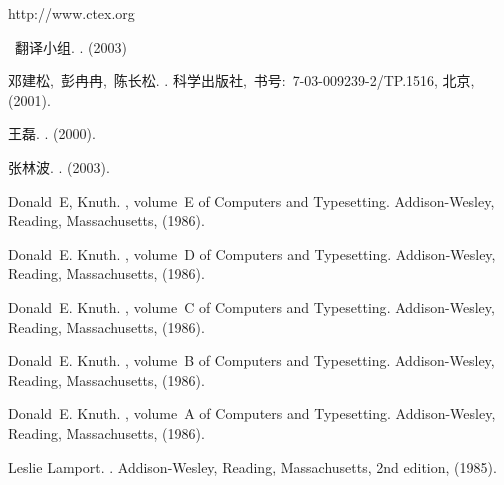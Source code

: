 
\fontsize{10.5pt}{10.5pt}\selectfont
\begin{thebibliography}{10}

 http://www.ctex.org


\CTeX{}~翻译小组.
.
\newblock (2003)


{邓建松,~彭冉冉,~陈长松}.
.
\newblock 科学出版社,~书号:~7-03-009239-2/TP.1516, 北京, (2001).

王磊.
.
\newblock (2000).

张林波.
.
\newblock (2003).

Donald~E, Knuth.
, volume~E of {Computers and
  Typesetting}.
\newblock Addison-Wesley, Reading, Massachusetts, (1986).

Donald~E. Knuth.
, volume~D of {Computers and
  Typesetting}.
\newblock Addison-Wesley, Reading, Massachusetts, (1986).

Donald~E. Knuth.
, volume~C of {Computers and
  Typesetting}.
\newblock Addison-Wesley, Reading, Massachusetts, (1986).

Donald~E. Knuth.
, volume~B of { Computers and
  Typesetting}.
\newblock Addison-Wesley, Reading, Massachusetts, (1986).

Donald~E. Knuth.
, volume~A of {Computers and Typesetting}.
\newblock Addison-Wesley, Reading, Massachusetts, (1986).

Leslie Lamport.
.
\newblock Addison-Wesley, Reading, Massachusetts, 2nd edition, (1985).

\end{thebibliography}
